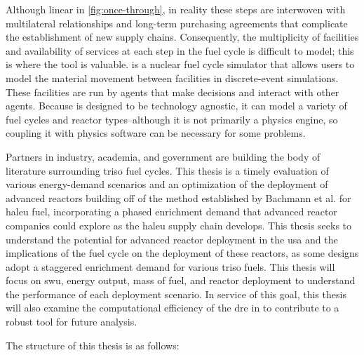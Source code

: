 
Although linear in \ref{fig:once-through}, in reality these steps are interwoven with multilateral relationships and long-term purchasing agreements that complicate the establishment of new supply chains. Consequently, the multiplicity of facilities and availability of services at each step in the fuel cycle is difficult to model; this is where the \cyclus \cite{huff_cyclus_intro_2016} tool is valuable. \cyclus is a nuclear fuel cycle simulator that allows users to model the material movement between facilities in discrete-event simulations. These facilities are run by agents that make decisions and interact with other agents. Because \cyclus is designed to be technology agnostic, it can model a variety of fuel cycles and reactor types--although it is not primarily a physics engine, so coupling it with physics software can be necessary for some problems.

Partners in industry, academia, and government are building the body of
literature surrounding \gls{triso} fuel cycles. This thesis is a timely
evaluation of various energy-demand scenarios and an optimization of the
deployment of advanced reactors building off of the method established by
Bachmann et al. \cite{bachmann_enrichment_2021} for \gls{haleu} fuel,
incorporating a phased enrichment demand that advanced reactor companies could
explore as the \gls{haleu} supply chain develops. This thesis seeks to
understand the potential for advanced reactor deployment in the \gls{usa} and
the implications of the fuel cycle on the deployment of these reactors, as some
designs adopt a staggered enrichment demand for various \gls{triso} fuels. This thesis will focus on \gls{swu}, energy output, mass of fuel, and reactor deployment to understand the performance of each deployment scenario. In service of this goal, this thesis will also examine the computational efficiency of the \gls{dre} in \cyclus to contribute to a robust tool for future analysis.


The structure of this thesis is as follows:

